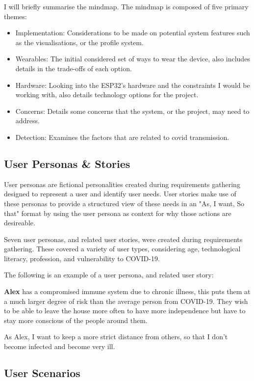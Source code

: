 \documentclass{l4proj}
\begin{document}
I will briefly summarise the mindmap. The mindmap is composed of five primary themes:
\begin{itemize}
    \item Implementation: Considerations to be made on potential system features such as the visualisations, or the profile system.
    \item Wearables: The initial considered set of ways to wear the device, also includes details in the trade-offs of each option.
    \item Hardware: Looking into the ESP32's hardware and the constraints I would be working with, also details technology options for the project.
    \item Concerns: Details some concerns that the system, or the project, may need to address.
    \item Detection: Examines the factors that are related to covid transmission.
\end{itemize}

\subsection{User Personas \& Stories}

User personas are fictional personalities created during requirements gathering designed to represent a user and identify user needs. User stories make use of these personas to provide a structured view of these needs in an "As, I want, So that" format by using the user persona as context for why those actions are desireable.

Seven user personas, and related user stories, were created during requirements gathering. These covered a variety of user types, considering age, technological literacy, profession, and vulnerability to COVID-19.

The following is an example of a user persona, and related user story:

\textbf{Alex} has a compromised immune system due to chronic illness, this puts them at a much larger degree of risk than the average person from COVID-19. They wish to be able to leave the house more often to have more independence but have to stay more conscious of the people around them.

As Alex, I want to keep a more strict distance from others, so that I don't become infected and become very ill.

\subsection{User Scenarios}
\end{document}
